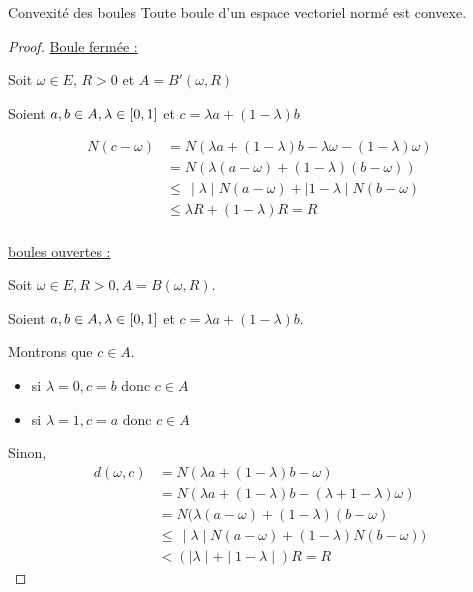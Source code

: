 \begin{proposition}{Convexité des boules}{}
    Toute boule d'un espace vectoriel normé est convexe. 
\end{proposition}



\begin{proof}
    \quad \underline{Boule fermée :}

    Soit $\omega \in E$, $R > 0$ et $A = B'( \omega, R)$
    
    Soient $a, b \in A, \lambda \in \left[0, 1\right]$ et $c = \lambda a + (1 - \lambda)b$

    \begin{align*}
        N(c - \omega) & = N(\lambda a + (1 - \lambda)b - \lambda \omega - (1 - \lambda) \omega) \\
        & = N(\lambda(a - \omega) + (1 - \lambda)(b - \omega)) \\
        & \leqslant \, \mid \lambda \mid N(a - \omega) + \mid 1 - \lambda \mid N(b - \omega) \\
        & \leqslant \lambda R + (1 - \lambda)R = R \\
    \end{align*}

    \quad \underline{boules ouvertes : }

    Soit $\omega  \in E, R > 0, A = B(\omega, R)$. 

    Soient $a, b \in A, \lambda \in \left[0, 1\right]$ et $c = \lambda a + (1 - \lambda)b$.

    Montrons que $c \in A$. 
    \begin{itemize}
        \item si $\lambda = 0, c = b$ donc $c \in A$
        \item si $\lambda = 1, c = a$ donc $c \in A$
    \end{itemize}

    Sinon, 
    \begin{align*}
        d(\omega, c) & = N(\lambda a + (1 - \lambda) b - \omega) \\
        & = N(\lambda a + (1 - \lambda) b - (\lambda + 1- \lambda) \omega) \\
        & = N(\lambda(a - \omega) + (1 - \lambda) (b - \omega) \\
        & \leqslant \, \mid \lambda \mid N(a - \omega) + (1 - \lambda)N(b - \omega)) \\
        & < (\mid \lambda \mid + \mid 1 - \lambda \mid) R = R
    \end{align*}
\end{proof}


